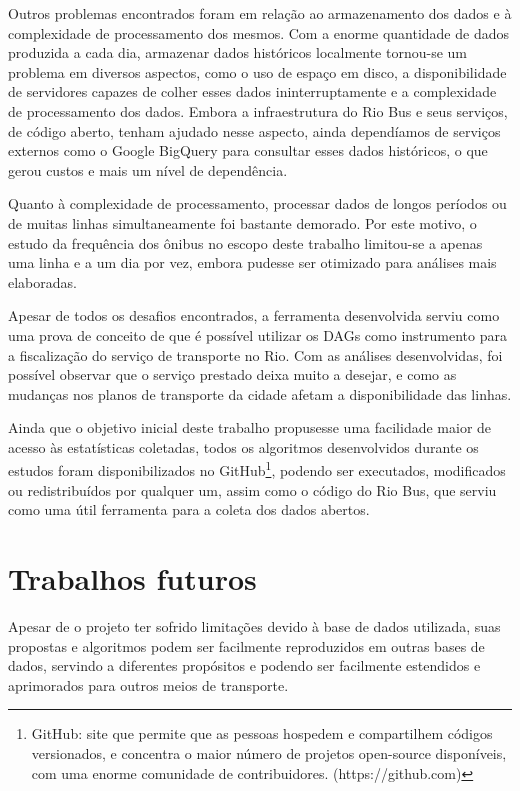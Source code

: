 Outros problemas encontrados foram em relação ao armazenamento dos dados e à complexidade de processamento dos mesmos. Com a enorme quantidade de dados produzida a cada dia, armazenar dados históricos localmente tornou-se um problema em diversos aspectos, como o uso de espaço em disco, a disponibilidade de servidores capazes de colher esses dados ininterruptamente e a complexidade de processamento dos dados. Embora a infraestrutura do Rio Bus e seus serviços, de código aberto, tenham ajudado nesse aspecto, ainda dependíamos de serviços externos como o Google BigQuery para consultar esses dados históricos, o que gerou custos e mais um nível de dependência.

Quanto à complexidade de processamento, processar dados de longos períodos ou de muitas linhas simultaneamente foi bastante demorado. Por este motivo, o estudo da frequência dos ônibus no escopo deste trabalho limitou-se a apenas uma linha e a um dia por vez, embora pudesse ser otimizado para análises mais elaboradas.

Apesar de todos os desafios encontrados, a ferramenta desenvolvida serviu como uma prova de conceito de que é possível utilizar os DAGs como instrumento para a fiscalização do serviço de transporte no Rio. Com as análises desenvolvidas, foi possível observar que o serviço prestado deixa muito a desejar, e como as mudanças nos planos de transporte da cidade afetam a disponibilidade das linhas.

Ainda que o objetivo inicial deste trabalho propusesse uma facilidade maior de acesso às estatísticas coletadas, todos os algoritmos desenvolvidos durante os estudos foram disponibilizados no GitHub\footnote{GitHub: site que permite que as pessoas hospedem e compartilhem códigos versionados, e concentra o maior número de projetos open-source disponíveis, com uma enorme comunidade de contribuidores. (https://github.com)}, podendo ser executados, modificados ou redistribuídos por qualquer um, assim como o código do Rio Bus, que serviu como uma útil ferramenta para a coleta dos dados abertos.


\section{Trabalhos futuros}

Apesar de o projeto ter sofrido limitações devido à base de dados utilizada, suas propostas e algoritmos podem ser facilmente reproduzidos em outras bases de dados, servindo a diferentes propósitos e podendo ser facilmente estendidos e aprimorados para outros meios de transporte.

